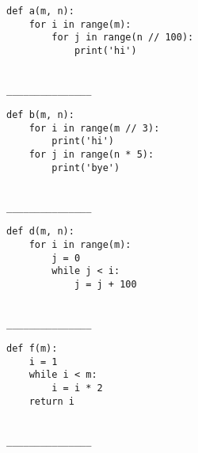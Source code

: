 \documentclass[twoside]{article}
\begin{document}
\begin{enumerate}
\begin{enumerate}
\begin{lstlisting}
def a(m, n):
    for i in range(m):
        for j in range(n // 100):
            print('hi')
\end{lstlisting}
~\\
\lstinline{_______________}

\begin{lstlisting}
def b(m, n):
    for i in range(m // 3):
        print('hi')
    for j in range(n * 5):
        print('bye')
\end{lstlisting}
~\\
\lstinline{_______________}

\begin{lstlisting}
def d(m, n):
    for i in range(m):
        j = 0
        while j < i:
            j = j + 100
\end{lstlisting}
~\\
\lstinline{_______________}

\begin{lstlisting}
def f(m):
    i = 1
    while i < m:
        i = i * 2
    return i
\end{lstlisting}
~\\
\lstinline{_______________}
\end{enumerate}

\end{enumerate}
\end{document}
